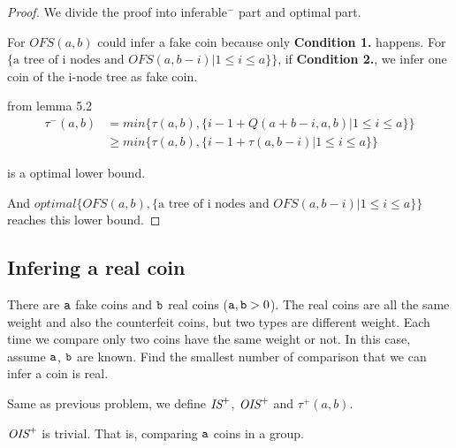 \begin{proof}
We divide the proof into inferable$^-$ part and optimal part.


For $OFS(a,b)$ could infer a fake coin because only \textbf{Condition 1.} happens.
For $\{\text{a tree of i nodes and }OFS(a,b-i) |1\leq i\leq a\}\}$, if \textbf{Condition 2.}, we infer one coin of the i-node tree as fake coin.

from lemma 5.2
\begin{align*}
\tau^-(a,b)&=min\{\tau(a,b),\{i-1+Q(a+b-i,a,b) | 1\leq i\leq a\} \}\\
&\geq min\{\tau(a,b), \{i-1+\tau(a,b-i) | 1\leq i\leq a\} \}
\end{align*}

is a optimal lower bound.

And $optimal\{OFS(a,b), \{\text{a tree of i nodes and }OFS(a,b-i) |1\leq i\leq a\}\}$ reaches this lower bound.

\end{proof}

\subsection*{Infering a real coin}

{
\setlength{\leftskip}{1cm}
\setlength{\rightskip}{1cm}
\noindent 
There are $\mathtt{a}$ fake coins and $\mathtt{b}$ real coins ($\mathtt{a}, \mathtt{b} > 0$). The real coins are all the same weight and also the counterfeit coins, but two  types are different weight. Each time we compare only two coins have the same weight or not. In this case, assume $\mathtt{a}$, $\mathtt{b}$ are known.
Find the smallest number of comparison that we can infer a coin is real.\\

}

\begin{definition}
Same as previous problem, we define $\text{\it IS}^+$, $\text{\it OIS}^+$ and $\tau^+(a,b)$.
\end{definition}

$\text{\it OIS}^+$ is trivial.
That is, comparing $\mathtt{a}$ coins in a group. 

